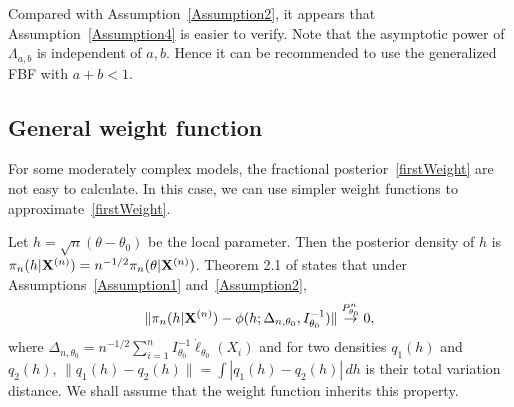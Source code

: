 \documentclass[11pt]{article}
\theoremstyle{plain}
\theoremstyle{definition}
\theoremstyle{remark}
\begin{document}
Compared with Assumption~\ref{Assumption2}, it appears that Assumption~\ref{Assumption4} is easier to verify.
Note that the asymptotic power of $\Lambda_{a,b}$ is independent of $a,b$.
Hence it can be recommended to use the generalized FBF with $a+b< 1$.


\subsection{General weight function}

For some moderately complex models, the fractional posterior~\eqref{firstWeight} are not easy to calculate.
In this case, we can use simpler weight functions to approximate~\eqref{firstWeight}.

Let $h=\sqrt{n}(\theta-\theta_0)$ be the local parameter.
Then the posterior density of $h$ is $\pi_n(h|\mathbf{X}^{(n)})=n^{-1/2}\pi_n(\theta|\mathbf{X}^{(n)})$.
Theorem 2.1 of \cite{Kleijn2012The} states that under Assumptions~\ref{Assumption1} and~\ref{Assumption2},
$$
            \|\pi_n(h|\mathbf{X}^{(n)})-\phi(h;\Delta_{n,\theta_0},I_{\theta_0}^{-1})\|\overset{P_{\theta_0}^n}{\to}0,
$$
where $\Delta_{n,\theta_0}=n^{-1/2}\sum_{i=1}^n I_{\theta_0}^{-1}\dot{\ell}_{\theta_0}(X_i)$ and for two densities $q_1(h)$ and $q_2(h)$, $\|q_1(h)-q_2(h)\|=\int |q_1(h)-q_2(h)|\, dh$ is their total variation distance.
We shall assume that the weight function inherits this property.
        
\end{document}
